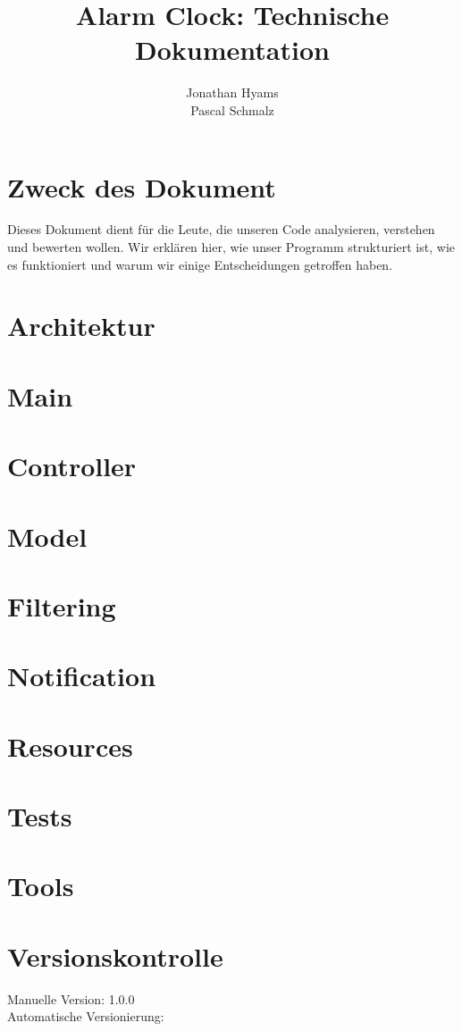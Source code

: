 \documentclass[11pt,titelpage]{scrartcl}
\title{Alarm Clock: Technische Dokumentation }
\author{Jonathan Hyams \\Pascal Schmalz}
\begin{document}
\thispagestyle{empty}
\maketitle
\pagebreak
\tableofcontents

\pagestyle{fancy}


\begin{abstract}
\end{abstract}
\pagebreak

\section{Zweck des Dokument}
Dieses Dokument dient für die Leute, die unseren Code analysieren, verstehen und bewerten wollen. Wir erklären hier, wie unser Programm strukturiert ist, wie es funktioniert
und warum wir einige Entscheidungen getroffen haben.
\section{Architektur}

\section{Main}

\section{Controller}

\section{Model}

\section{Filtering}

\section{Notification}

\section{Resources}

\section{Tests}

\section{Tools}


\section{Versionskontrolle}
Manuelle Version: 1.0.0
\\

\noindent
Automatische Versionierung:
\immediate{}

\immediate{}
\end{document}
